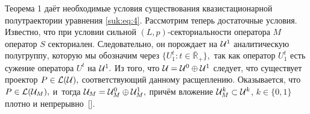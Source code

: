 

Теорема 1 даёт  необходимые условия существования квазистационарной полутраектории уравнения \eqref{suk:eq:4}. 
Рассмотрим теперь достаточные  условия.
Известно, что при условии сильной $(L,p)$-секториальности оператора $M$ оператор  $S$  секториален.  
Следовательно,  он порождает  на  ${\cal U}^1$  аналитическую   полугруппу,   которую  мы обозначим через 
$\{ U_1^t: t \in \bar {\mathbb R}_{+} \},$  так  как оператор $U_1^t$ есть  сужение  оператора  $U^t$  на  ${\cal U}^1.$
Из того, что  ${\cal U}={\cal U}^0 \oplus {\cal U}^1$ следует, что существует проектор $P\in {\cal L}({\cal U}),$ соответствующий данному
расщеплению. Оказывается, что $P\in {\cal L}({\cal U}_M),$  и~тогда ${\cal U}_M={\cal U}^0_M \oplus {\cal U}^1_M,$
причём вложение ${\cal U}^k_M \subset {\cal U}^k$,  $k\in\{0, 1\}$ плотно  и непрерывно~[].

